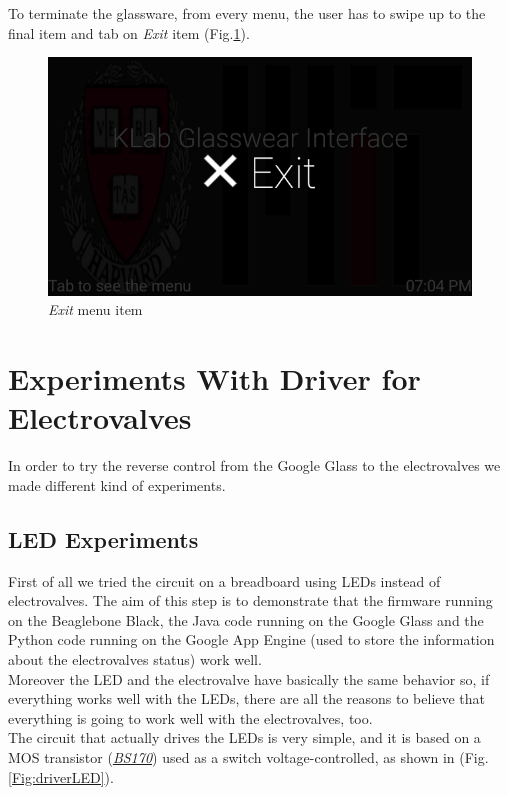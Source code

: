 \documentclass[12pt,a4paper,twoside]{article}
\begin{document}
	To terminate the glassware, from every menu, the user has to swipe up to the final item and tab on \textit{Exit} item (Fig.\ref{Fig:Exit}).
	
	\begin{figure}[h]
		\centering
		\includegraphics[scale=.28]{Intro/exit}
		\caption{\textit{Exit} menu item}
		\label{Fig:Exit}
	\end{figure}
	
	\section*{Experiments With Driver for Electrovalves}
	
	In order to try the reverse control from the Google Glass to the electrovalves we made different kind of experiments.\\
	
	\subsection*{LED Experiments}
	 First of all we tried the circuit on a breadboard using LEDs instead of electrovalves. The aim of this step is to demonstrate that the firmware running on the Beaglebone Black, the Java code running on the Google Glass and the Python code running on the Google App Engine (used to store the information about the electrovalves status) work well.\\
	Moreover the LED and the electrovalve have basically the same behavior so, if everything works well with the LEDs, there are all the reasons to believe that everything is going to work well with the electrovalves, too.\\
	
	The circuit that actually drives the LEDs is very simple, and it is based on a MOS transistor (\href{http://www.onsemi.com/pub_link/Collateral/BS170-D.PDF}{\textit{BS170}}) used as a switch voltage-controlled, as shown in (Fig.\ref{Fig:driverLED}).
	
\end{document}
